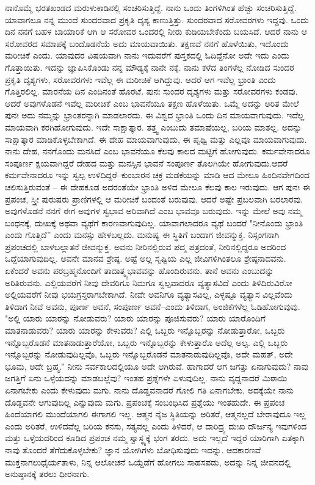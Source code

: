ನಾನೊಮ್ಮೆ ಭರತಖಂಡದ ಮರುಳುಕಾಡಿನಲ್ಲಿ ಸಂಚರಿಸುತ್ತಿದ್ದೆ. ನಾನು ಒಂದು ತಿಂಗಳಿಗಿಂತ ಹೆಚ್ಚು ಸಂಚರಿಸುತ್ತಿದ್ದೆ. ಯಾವಾಗಲೂ ನನ್ನ ಮುಂದೆ ಸುಂದರವಾದ ಪ್ರಕೃತಿ ದೃಶ್ಯ ಕಾಣುತ್ತಿತ್ತು. ಸುಂದರವಾದ ಸರೋವರಗಳು ಇದ್ದವು. ಒಂದು ದಿನ ನನಗೆ ಬಹಳ ಬಾಯಾರಿಕೆ ಆಗಿ ಆ ಸರೋವರ ಒಂದರಲ್ಲಿ ನೀರು ಕುಡಿಯಬೇಕೆಂದು ಬಯಸಿದೆ. ಆದರೆ ನಾನು ಆ ಸರೋವರದ ಸಮಾಪಕ್ಕೆ ಬಂದೊಡನೆಯೆ ಅದು ಮಾಯವಾಯಿತು. ತಕ್ಷಣವೆ ನನಗೆ ಹೊಳೆಯಿತು, ಇದೊಂದು ಮರೀಚಿಕೆ ಎಂದು. ಯಾವುದರ ವಿಷಯವಾಗಿ ನಾನು ಇದುವರೆಗೆ ಪುಸ್ತಕದಲ್ಲಿ ಓದಿದ್ದೆನೋ ಅದೇ ಇದು ಎಂದು ಗೊತ್ತಾಯಿತು. ಇದನ್ನು ಜ್ಞಾಪಿಸಿಕೊಂಡು ನನ್ನ ಮೌಡ್ಯಕ್ಕೆ ನಾನೇ ನಕ್ಕೆ. ನಾನು ಕಳೆದ ತಿಂಗಳೆಲ್ಲ ನೋಡಿದ ಸುಂದರ ಪ್ರಕೃತಿ ದೃಶ್ಯಗಳು, ಸರೋವರಗಳು ಇವೆಲ್ಲ ಈ ಮರೀಚಿಕೆ ಆಗಿದ್ದುವು. ಆದರೆ ಆಗ ಇವೆಲ್ಲ ಭ್ರಾಂತಿ ಎಂದು ಗೊತ್ತಿರಲಿಲ್ಲ. ಮಾರನೆಯ ದಿನ ಎಂದಿನಂತೆ ಹೊರಟೆ. ಪುನಃ ಸುಂದರ ದೃಶ್ಯಗಳು ಮತ್ತು ಸರೋವರಗಳು ಕಂಡವು. ಆದರೆ ಅವುಗಳೊಡನೆ ಇವೆಲ್ಲ ಮರೀಚಿಕೆ ಎಂಬ ಭಾವನೆಯೂ ತಕ್ಷಣ ಹೊಳೆಯಿತು. ಒಮ್ಮೆ ಅದನ್ನು ಅರಿತ ಮೇಲೆ ಪುನಃ ಅದು ನಮ್ಮನ್ನು ಭ್ರಾಂತರನ್ನಾಗಿ ಮಾಡಲಾರದು. ಈ ವಿಶ್ವದ ಭ್ರಾಂತಿ ಒಂದು ದಿನ ಮಾಯವಾಗುವುದು. ಇದೆಲ್ಲ ಮಾಯವಾಗಿ ಕರಗಿಹೋಗುವುದು. ಇದೇ ಸಾಕ್ಷಾತ್ಕಾರ. ತತ್ತ್ವ ಎಂಬುದು ತಮಾಷೆಯಲ್ಲ, ಬರಿಯ ಮಾತಲ್ಲ. ಅದನ್ನು ಸಾಕ್ಷಾತ್ಕಾರ ಮಾಡಿಕೊಳ್ಳಬೇಕಾಗಿದೆ. ಈ ದೇಹ ಮಾಯವಾಗುವುದು, ಈ ಪೃಥ್ವಿ ಮತ್ತು ಎಲ್ಲವೂ ಮಾಯವಾಗುವುದು. ನಾನು ದೇಹ, ನನಗೊಂದು ಮನಸಿದೆ ಎಂಬ ಭಾವನೆಯೂ ಕೆಲವು ಕಾಲದ ಮಟ್ಟಿಗೆ ಹೋಗುವುದು. ಕರ್ಮವೇನಾದರೂ ಸಂಪೂರ್ಣ ಕ್ಷಯವಾಗಿದ್ದರೆ ದೇಹದ ಮತ್ತು ಮನಸ್ಸಿನ ಭಾವನೆ ಸಂಪೂರ್ಣ ತೊಲಗಿಯೇ ಹೋಗುವುದು.\break ಆದರೆ ಕರ್ಮವೇನಾದರೂ ಇನ್ನು ಸ್ವಲ್ಪ ಉಳಿದಿದ್ದರೆ–ಕುಂಬಾರನ ಚಕ್ರ ಮಡಕೆಯನ್ನು ಮಾಡಿ ಆದ ಮೇಲೂ ಹಿಂದಿನವೇಗದಿಂದ ಚಲಿಸುತ್ತಿರುವಂತೆ – ಈ ದೇಹಕೂಡ ಅದರಂತೆಯೇ ಭ್ರಾಂತಿ ಅಳಿದ ಮೇಲೂ ಕೆಲವು ಕಾಲ ಇರುವುದು. ಆಗ ಪುನಃ ಈ ಪ್ರಪಂಚ, ಸ್ತ್ರೀ ಪುರುಷರು ಪ್ರಾಣಿಗಳಲ್ಲಿ ಆ ಮರೀಚಿಕೆ ಬಂದಂತೆ ಬರುವುವು. ಆದರೆ ಅಷ್ಟೇ ಪ್ರಬಲವಾಗಿ ಬರಲಾರವು. ಅವುಗಳೊಡನೆ ನನಗೆ ಈಗ ಅವುಗಳ ಸ್ವಭಾವ ಅರಿವಾಗಿದೆ ಎಂಬ ಭಾವವೂ ಬರುವುದು. ಇನ್ನು ಮೇಲೆ ಅವು ನಮ್ಮ ಬಂಧನಕ್ಕೆ, ದುಃಖಕ್ಕೆ ಅಥವಾ ವ್ಯಥೆಗೆ ಕಾರಣವಾಗುವುದಿಲ್ಲ. ಯಾವಾಗಲಾದರೂ ವ್ಯಥೆ ಬಂದರೆ "ನೀನೊಂದು ಭ್ರಾಂತಿ ಎಂದು ಗೊತ್ತಿದೆ'' ಎಂದು ಮನಸ್ಸು ಹೇಳಬಲ್ಲದು. ಮನುಷ್ಯ ಈ ಸ್ಥಿತಿಗೆ ಬಂದಾಗ ಜೀವನ್ಮುಕ್ತ. ನಿಸ್ಸಂಗನಾಗಿ ಪ್ರಪಂಚದಲ್ಲಿ ಬಾಳಬಲ್ಲಾತನೆ ಜೀವನ್ಮುಕ್ತ. ಅವನು ನೀರಿನಲ್ಲಿರುವ ಪದ್ಮ ಪತ್ರದಂತೆ, ನೀರಿನಲ್ಲಿದ್ದರೂ ಅದರಿಂದ ಒದ್ದೆಯಾಗುವುದಿಲ್ಲ. ಅವನೇ ಮಾನವ ಶ್ರೇಷ್ಠ. ಅಷ್ಟೆ ಅಲ್ಲ ಸೃಷ್ಟಿಯ ಎಲ್ಲ ಜೀವಿಗಳಿಗಿಂತಲೂ ಶ್ರೇಷ್ಠನಾದವನು. ಏಕೆಂದರೆ ಅವನು ಪರಬ್ರಹ್ಮನೊಂದಿಗೆ ತಾದಾತ್ಮ್ಯಭಾವವನ್ನು ಹೊಂದಿರುವನು. ತಾನೆ ಅವನು ಎಂಬುದನ್ನು ಅರಿತಿರುವನು. ಎಲ್ಲಿಯವರೆಗೆ ನೀವು ದೇವರಿಗೂ ನಿಮಗೂ ಸ್ವಲ್ಪವಾದರೂ ವ್ಯತ್ಯಾಸವಿದೆ ಎಂದು ತಿಳಿದಿರುವಿರೋ ಅಲ್ಲಿಯವರೆಗೆ ನೀವು ಭಯಗ್ರಸ್ತರಾಗಬೇಕಾಗಿದೆ. ನೀವೇ ಅವನಿಗೂ ವ್ಯತ್ಯಾಸವಿಲ್ಲ, ಎಳ್ಳಷ್ಟೂ ವ್ಯತ್ಯಾಸ ವಿಲ್ಲವೆಂದು ತಿಳಿದಾಗ ನೀವೆ ಅವನು, ಪೂರ್ಣ ಅವನೆ, ಸಂಪೂರ್ಣ ಅವನೆ–ಎಂದು ತಿಳಿದಾಗ, ಅಂಜಿಕೆಗಳೆಲ್ಲ ಓಡಿಹೋಗುವುವು. "ಅಲ್ಲಿ ಯಾರು ಯಾರನ್ನು ನೋಡುವರು? ಯಾರು ಯಾರನ್ನು ಪೂಜಿಸುವರು? ಯಾರು ಯಾರೊಂದಿಗೆ ಮಾತನಾಡುವರು? ಯಾರು ಯಾರನ್ನು ಕೇಳುವರು? ಎಲ್ಲಿ ಒಬ್ಬರು ಇನ್ನೊಬ್ಬರನ್ನು ನೋಡುತ್ತಾರೋ, ಒಬ್ಬರು ಇನ್ನೊಬ್ಬರೊಡನೆ ಮಾತನಾಡುತ್ತಾರೆಯೋ, ಒಬ್ಬರು ಇನ್ನೊಬ್ಬರನ್ನು ಕೇಳುತ್ತಾರೊ ಅದೆಲ್ಲ ಅಲ್ಪ. ಎಲ್ಲಿ ಒಬ್ಬರು ಇನ್ನೊಬ್ಬರನ್ನು ನೋಡುವುದಿಲ್ಲವೊ, ಒಬ್ಬರು ಇನ್ನೊಬ್ಬರೊಡನೆ ಮಾತನಾಡುವುದಿಲ್ಲವೊ, ಅದೇ ಮಹತ್, ಅದೇ ಭೂಮ, ಅದೇ ಬ್ರಹ್ಮ.” ನೀನು ಸರ್ವಕಾಲದಲ್ಲಿಯೂ ಅದೇ ಆಗಿರುವೆ. ಹಾಗಾದರೆ ಆಗ ಜಗತ್ತು ಏನಾಗುವುದು? ನಾವು ಜಗತ್ತಿಗೆ ಏನು ಒಳ್ಳೆಯದನ್ನು ಮಾಡಬಲ್ಲೆವು? ಇಂತಹ ಪ್ರಶ್ನೆಗಳೇ ಏಳುವುದಿಲ್ಲ. ನಾನು ವೃದ್ದನಾದರೆ ಮಿಠಾಯಿ ಏನಾಗಬೇಕು ಎಂದು ಕೇಳುವುದು ಮಗು. ನಾನು ದೊಡ್ಡವನಾದರೆ ಗೋಲಿ ಗತಿ ಏನಾಗಬೇಕು, ಅದಕ್ಕೆಯೇ ನಾನು ದೊಡ್ಡವನೇ ಆಗುವುದಿಲ್ಲ ಎನ್ನುವುದು ಮಗು. ಪ್ರಪಂಚಕ್ಕೆ ಸಂಬಂಧಿಸಿದ ಪ್ರಶ್ನೆಯು ಇಂತಹುದೇ. ಈ ಪ್ರಪಂಚ ಹಿಂದೆಯಾಗಲಿ ಮುಂದೆಯಾಗಲಿ ಈಗಾಗಲಿ ಇಲ್ಲ. ಆತ್ಮನ ನೈಜ ಸ್ಥಿತಿಯನ್ನು ಅರಿತರೆ, ಆತ್ಮನಲ್ಲದೆ ಬೇರಾವುದೂ ಇಲ್ಲ ಎಂದು ಅರಿತರೆ, ಉಳಿದವೆಲ್ಲ ಬರಿಯ ಕನಸು, ಸತ್ಯವಲ್ಲ ಎಂದು ತಿಳಿದರೆ, ಆ ದಾರಿದ್ರ್ಯ ದುಃಖ ದೌರ್ಜನ್ಯ ಇವುಗಳಿಂದ ಮತ್ತು ಒಳ್ಳೆಯದರಿಂದ ಕೂಡಿದ ಪ್ರಪಂಚ ನಮ್ಮ ಸ್ವಾಸ್ಥ್ಯಕ್ಕೆ ಭಂಗ ತರದು. ಅದು ಇಲ್ಲದೆ ಇದ್ದರೆ ಯಾರಿಗಾಗಿ ಏತಕ್ಕಾಗಿ ನಾವು ತೊಂದರೆ ತೆಗೆದುಕೊಳ್ಳಬೇಕು? ಜ್ಞಾನ ಯೋಗಿಗಳು ಬೋಧಿಸುವುದು ಇದನ್ನು. ಆದಕಾರಣವೆ ಮುಕ್ತನಾಗಲು\break ಧೈರ್ಯತಾಳು, ನಿನ್ನ ಆಲೋಚನೆ ಒಯ್ದೆಡೆಗೆ ಹೋಗಲು ಸಾಹಸಪಡು, ಅದನ್ನು ನಿನ್ನ ಜೀವನದಲ್ಲಿ ಅನುಷ್ಠಾನಕ್ಕೆ ತರಲು ಧೀರನಾಗು. 